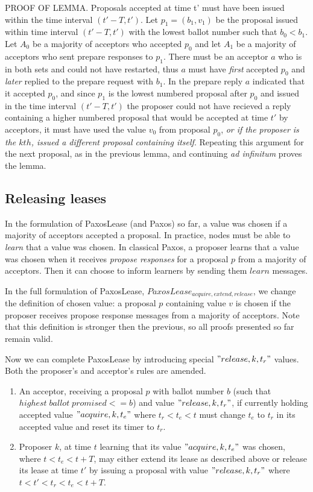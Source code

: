 \documentclass[12pt]{article}
\begin{document}
PROOF OF LEMMA. Proposals accepted at time t' must have been issued within the time interval $(t' - T, t')$. Let $p_1 = (b_1, v_1)$ be the proposal issued within time interval $(t' - T, t')$ with the lowest ballot number such that $b_0 < b_1$. Let $A_0$ be a majority of acceptors who accepted $p_0$ and let $A_1$ be a majority of acceptors who sent prepare responses to $p_1$. There must be an acceptor $a$ who is in both sets and could not have restarted, thus $a$ must have \emph{first} accepted $p_0$ and \emph{later} replied to the prepare request with $b_1$. In the prepare reply $a$ indicated that it accepted $p_0$, and since $p_1$ is the lowest numbered proposal after $p_0$ and issued in the time interval $(t' - T, t')$ the proposer could not have recieved a reply containing a higher numbered proposal that would be accepted at time $t'$ by acceptors, it must have used the value $v_0$ from proposal $p_0$, \emph{or if the proposer is the $kth$, issued a different proposal containing itself}. Repeating this argument for the next proposal, as in the previous lemma, and continuing \emph{ad infinitum} proves the lemma.

\subsection{ Releasing leases }

In the formulation of PaxosLease (and Paxos) so far, a value was chosen if a majority of acceptors accepted a proposal. In practice, nodes must be able to \emph{learn} that a value was chosen. In classical Paxos, a proposer learns that a value was chosen when it receives \emph{propose responses} for a proposal $p$ from a majority of acceptors. Then it can choose to inform learners by sending them $learn$ messages.

In the full formulation of PaxosLease, $PaxosLease_{acquire, extend, release}$, we change the definition of chosen value: a proposal $p$ containing value $v$ is chosen if the proposer receives propose response messages from a majority of acceptors.
Note that this definition is stronger then the previous, so all proofs presented so far remain valid.

Now we can complete PaxosLease by introducing special $"release, k, t_r"$ values. Both the proposer's and acceptor's rules are amended.

\begin{enumerate}

\item An acceptor, receiving a proposal $p$ with ballot number $b$ (such that $highest \; ballot \; promised <= b$) and value $"release, k, t_r"$, if currently holding accepted value $"acquire, k, t_e"$ where $t_r < t_e < t$ must change $t_e$ to $t_r$ in its accepted value and reset its timer to $t_r$.

\item Proposer $k$, at time $t$ learning that its value $"acquire, k, t_e"$ was chosen, where $t < t_e < t + T$, may either extend its lease as described above or release its lease at time $t'$ by issuing a proposal with value $"release, k, t_r"$ where $t < t' <  t_r < t_e < t + T$.

\end{enumerate}
\end{document}
